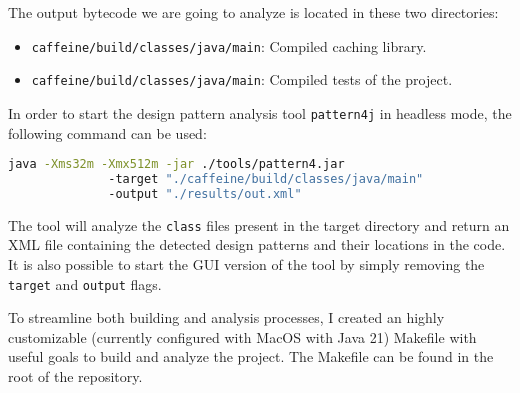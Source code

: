 The output bytecode we are going to analyze is located in these two directories:

\begin{itemize}
  \item \texttt{caffeine/build/classes/java/main}: Compiled caching library.
  \item \texttt{caffeine/build/classes/java/main}: Compiled tests of the project.
\end{itemize}

\noindent In order to start the design pattern analysis tool \texttt{pattern4j} in headless mode, the following command can be used:

\begin{lstlisting}[language=bash, caption={Bash command to start the pattern4j design pattern analysis in headless mode}]
            java -Xms32m -Xmx512m -jar ./tools/pattern4.jar
              -target "./caffeine/build/classes/java/main"
              -output "./results/out.xml"
\end{lstlisting}

\noindent The tool will analyze the \texttt{class} files present in the target directory and return an XML file containing the detected design patterns and their locations in the code. It is also possible to start the GUI version of the tool by simply removing the \texttt{target} and \texttt{output} flags.

To streamline both building and analysis processes, I created an highly customizable (currently configured with MacOS with Java 21) Makefile with useful goals to build and analyze the project. The Makefile can be found in the root of the repository.

